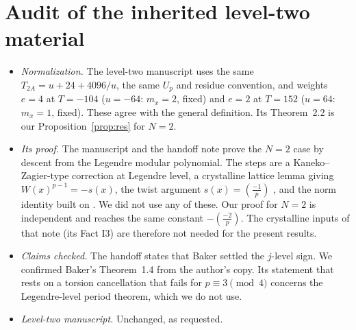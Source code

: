 \documentclass[11pt,a4paper]{article}
\numberwithin{equation}{section}
\theoremstyle{definition}
\theoremstyle{remark}
\newcommand{\Lp}[1]{\left(\frac{#1}{p}\right)}
\begin{document}
\section{Audit of the inherited level-two material}\label{sec:audit}
\begin{itemize}
\item \emph{Normalization.} The level-two manuscript \citep{Jordan26} uses the same $T_{2A}=u+24+4096/u$, the
same $U_p$ and residue convention, and weights $e=4$ at $T=-104$ ($u=-64$: $m_x=2$, fixed) and $e=2$
at $T=152$ ($u=64$: $m_x=1$, fixed). These agree with the general definition.
Its Theorem~2.2 is our Proposition~\ref{prop:res} for $N=2$.
\item \emph{Its proof.} The manuscript and the handoff note prove the $N=2$ case by descent from the
Legendre modular polynomial. The steps are a Kaneko--Zagier-type correction at Legendre level, a
crystalline lattice lemma giving $W(x)^{p-1}=-s(x)$, the twist argument $s(x)=\Lp{-1}$ \citep[Prop.~2.2]{AT02},
and the norm identity built on \citet[Prop.~3.1]{AT02}. We did not use any of these. Our proof for $N=2$ is independent and reaches the same constant $-\Lp{-2}$.
The crystalline inputs of that note (its Fact I3) are therefore not needed for the present
results.
\item \emph{Claims checked.} The handoff states that Baker settled the $j$-level sign. We confirmed
Baker's Theorem~1.4 from the author's copy. Its statement that \citet[Thm.~1.1(iii)]{BLpre} rests on a torsion cancellation that fails
for $p\equiv3\pmod4$ concerns the Legendre-level period theorem, which we do not use.
\item \emph{Level-two manuscript.} Unchanged, as requested.
\end{itemize}

\end{document}
